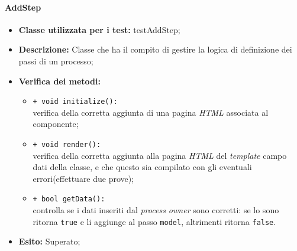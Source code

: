 \paragraph{AddStep}
\begin{flushleft}
\begin{itemize}
\item \textbf{Classe utilizzata per i test:} testAddStep;
\item \textbf{Descrizione:} Classe che ha il compito di gestire la logica di definizione dei passi di un processo;
\item \textbf{Verifica dei metodi:}
\begin{sloppypar}
\begin{itemize}
\item \texttt{+ void initialize():}\\ verifica della corretta aggiunta di una pagina \textit{HTML} associata al componente;
\item \texttt{+ void render():}\\ verifica della corretta aggiunta alla pagina \textit{HTML} del \textit{template} campo dati della classe, e che questo sia compilato con gli eventuali errori(effettuare due prove);
\item \texttt{+ bool getData():}\\ controlla se i dati inseriti dal \textit{process owner} sono corretti: se lo sono ritorna \texttt{true} e li aggiunge al passo \texttt{model}, altrimenti ritorna \texttt{false}.
\end{itemize}
\end{sloppypar}
\item \textbf{Esito:} Superato;
\end{itemize}
\end{flushleft}

